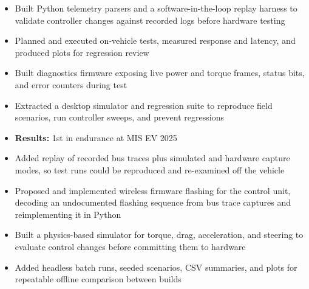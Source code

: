 \documentclass[10pt,letterpaper]{article}
\begin{document}
\orgline{\spartanracing}
\begin{itemize}
  \item Built Python telemetry parsers and a software-in-the-loop replay harness to validate controller changes against recorded logs before hardware testing
  \item Planned and executed on-vehicle tests, measured response and latency, and produced plots for regression review
  \item Built diagnostics firmware exposing live power and torque frames, status bits, and error counters during test
\end{itemize}

\entryspace

\orgline{\spartanracing}
\begin{itemize}
  \item Extracted a desktop simulator and regression suite to reproduce field scenarios, run controller sweeps, and prevent regressions
  \item \textbf{Results:} 1st in endurance at MIS EV 2025
\end{itemize}


\begin{itemize}
  \item Added replay of recorded bus traces plus simulated and hardware capture modes, so test runs could be reproduced and re-examined off the vehicle
  \item Proposed and implemented wireless firmware flashing for the control unit, decoding an undocumented flashing sequence from bus trace captures and reimplementing it in Python
\end{itemize}

\entryspace

\orgline{\spartanracing}
\begin{itemize}
  \item Built a physics-based simulator for torque, drag, acceleration, and steering to evaluate control changes before committing them to hardware
  \item Added headless batch runs, seeded scenarios, CSV summaries, and plots for repeatable offline comparison between builds
\end{itemize}
\end{document}
